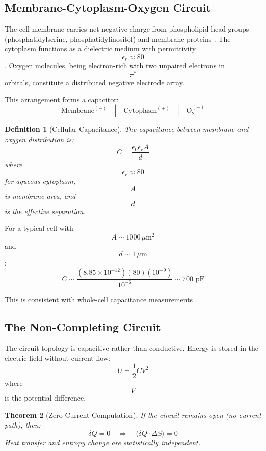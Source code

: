 \documentclass[twocolumn,10pt]{article}
\newtheorem{theorem}{Theorem}[section]
\newtheorem{definition}[theorem]{Definition}
\begin{document}
\subsection{Membrane-Cytoplasm-Oxygen Circuit}

The cell membrane carries net negative charge from phospholipid head groups (phosphatidylserine, phosphatidylinositol) and membrane proteins \cite{Devaux1991}. The cytoplasm functions as a dielectric medium with permittivity $$\epsilon_r \approx 80$$. Oxygen molecules, being electron-rich with two unpaired electrons in $$\pi^*$$ orbitals, constitute a distributed negative electrode array.

This arrangement forms a capacitor:
\begin{equation}
\text{Membrane}^{(-)} \quad | \quad \text{Cytoplasm}^{(+)} \quad | \quad \text{O}_2^{(-)}
\end{equation}

\begin{definition}[Cellular Capacitance]
The capacitance between membrane and oxygen distribution is:
\begin{equation}
C = \frac{\epsilon_0 \epsilon_r A}{d}
\end{equation}
where $$\epsilon_r \approx 80$$ for aqueous cytoplasm, $$A$$ is membrane area, and $$d$$ is the effective separation.
\end{definition}

For a typical cell with $$A \sim 1000 \, \mu\text{m}^2$$ and $$d \sim 1 \, \mu\text{m}$$:
\begin{equation}
C \sim \frac{(8.85 \times 10^{-12})(80)(10^{-9})}{10^{-6}} \sim 700 \text{ pF}
\end{equation}

This is consistent with whole-cell capacitance measurements \cite{Bhargava2013}.

\subsection{The Non-Completing Circuit}

The circuit topology is capacitive rather than conductive. Energy is stored in the electric field without current flow:
\begin{equation}
U = \frac{1}{2} C V^2
\end{equation}
where $$V$$ is the potential difference.

\begin{theorem}[Zero-Current Computation]
If the circuit remains open (no current path), then:
\begin{equation}
\delta Q = 0 \quad \Rightarrow \quad \langle \delta Q \cdot \Delta S \rangle = 0
\end{equation}
Heat transfer and entropy change are statistically independent.
\end{theorem}
\end{document}
